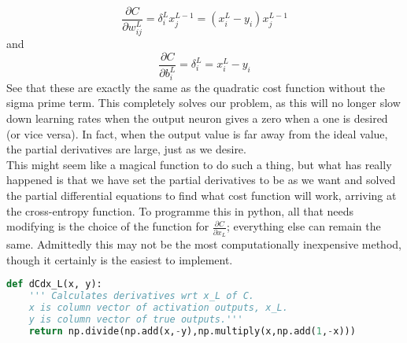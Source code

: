 \documentclass[10pt]{article}
\begin{document}
\[
\frac{\partial C}{\partial w^{L}_{ij}} = \delta^{L}_{i} x^{L-1}_j =
\left(x^{L}_i - y_i\right)x^{L-1}_j
\]
and
\[
\frac{\partial C}{\partial b^{L}_{i}} = \delta^{L}_{i} =
x^{L}_i - y_i
\]
See that these are exactly the same as the quadratic cost function without the sigma prime term. This completely solves our problem, as this will no longer slow down learning rates when the output neuron gives a zero when a one is desired (or vice versa). In fact, when the output value is far away from the ideal value, the partial derivatives are large, just as we desire.\\
This might seem like a magical function to do such a thing, but what has really happened is that we have set the partial derivatives to be as we want and solved the partial differential equations to find what cost function will work, arriving at the cross-entropy function. To programme this in python, all that needs modifying is the choice of the function for $\frac{\partial C}{\partial x_L}$; everything else can remain the same. Admittedly this may not be the most computationally inexpensive method, though it certainly is the easiest to implement.
\begin{lstlisting}[language=Python, breaklines, basicstyle=\small]
def dCdx_L(x, y):
	''' Calculates derivatives wrt x_L of C.
	x is column vector of activation outputs, x_L.
	y is column vector of true outputs.'''
	return np.divide(np.add(x,-y),np.multiply(x,np.add(1,-x)))
\end{lstlisting}
\end{document}
